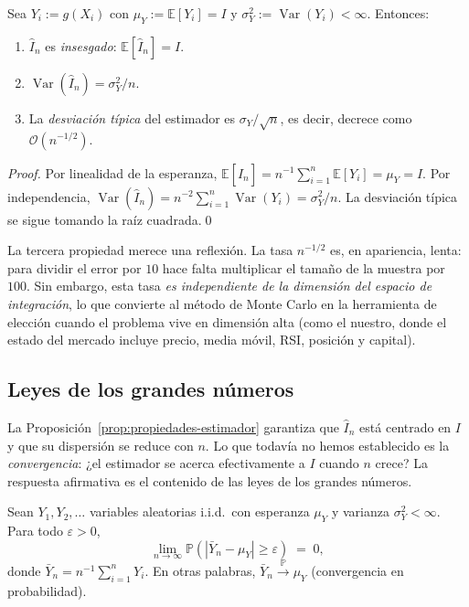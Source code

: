 \begin{proposicion}
\label{prop:propiedades-estimador}
Sea $Y_i := g(X_i)$ con $\mu_Y := \mathbb{E}[Y_i] = I$ y $\sigma_Y^2 := \operatorname{Var}(Y_i) < \infty$. Entonces:
\begin{enumerate}
    \item $\widehat{I}_n$ es \emph{insesgado}: $\mathbb{E}[\widehat{I}_n] = I$.
    \item $\operatorname{Var}(\widehat{I}_n) = \sigma_Y^2 / n$.
    \item La \emph{desviación típica} del estimador es $\sigma_Y / \sqrt{n}$, es decir, decrece como $\mathcal{O}(n^{-1/2})$.
\end{enumerate}
\end{proposicion}

\begin{proof}
Por linealidad de la esperanza, $\mathbb{E}[\widehat{I}_n] = n^{-1}\sum_{i=1}^n \mathbb{E}[Y_i] = \mu_Y = I$. Por independencia, $\operatorname{Var}(\widehat{I}_n) = n^{-2}\sum_{i=1}^n \operatorname{Var}(Y_i) = \sigma_Y^2/n$. La desviación típica se sigue tomando la raíz cuadrada.\qed
\end{proof}

La tercera propiedad merece una reflexión. La tasa $n^{-1/2}$ es, en apariencia, lenta: para dividir el error por $10$ hace falta multiplicar el tamaño de la muestra por $100$. Sin embargo, esta tasa \emph{es independiente de la dimensión del espacio de integración}, lo que convierte al método de Monte Carlo en la herramienta de elección cuando el problema vive en dimensión alta (como el nuestro, donde el estado del mercado incluye precio, media móvil, RSI, posición y capital).

\subsection{Leyes de los grandes números}
\label{subsec:llng}

La Proposición~\ref{prop:propiedades-estimador} garantiza que $\widehat{I}_n$ está centrado en $I$ y que su dispersión se reduce con $n$. Lo que todavía no hemos establecido es la \emph{convergencia}: ¿el estimador se acerca efectivamente a $I$ cuando $n$ crece? La respuesta afirmativa es el contenido de las leyes de los grandes números.

\begin{teorema}
\label{teorema:lldn}
Sean $Y_1, Y_2, \ldots$ variables aleatorias i.i.d.\ con esperanza $\mu_Y$ y varianza $\sigma_Y^2 < \infty$. Para todo $\varepsilon > 0$,
\[
    \lim_{n \to \infty} \mathbb{P}\!\left(\left|\bar{Y}_n - \mu_Y\right| \geq \varepsilon\right) \;=\; 0,
\]
donde $\bar{Y}_n = n^{-1}\sum_{i=1}^n Y_i$. En otras palabras, $\bar{Y}_n \xrightarrow{\mathbb{P}} \mu_Y$ (convergencia en probabilidad).
\end{teorema}

